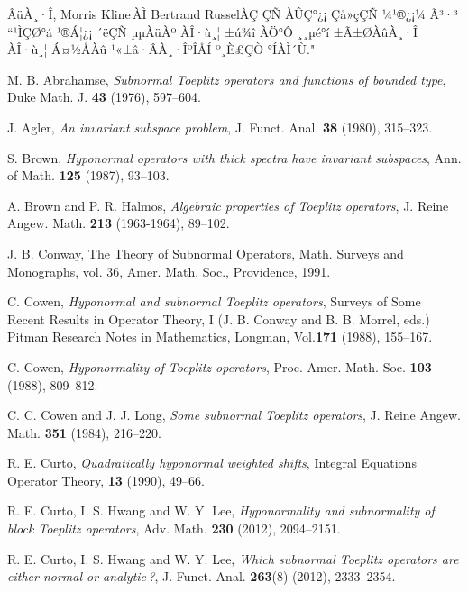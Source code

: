 \documentclass[12pt,a4paper,2sided]{article}
\begin{document}
\newpage
{}

\vspace{0.8cm}

ÂüÀ¸·Î, Morris Kline\,ÀÌ Bertrand RusselÀÇ ÇÑ ÀÛÇ°¿¡ Çå»çÇÑ ¼­¹®¿¡¼­
Ã³·³ ``¹ÌÇØ°á ¹®Á¦¿¡ ´ëÇÑ µµÀüÀº ÀÎ·ù¸¦ ±ú¾î ÀÖ°Ô ¸¸µé°í ±Ã±ØÀûÀ¸·Î
ÀÎ·ù¸¦ Á¤½ÅÀû ¹«±â·ÂÀ¸·ÎºÎÅÍ º¸È£ÇÒ °ÍÀÌ´Ù."



\begin{thebibliography}{99}\footnotesize


 M. B. Abrahamse,
{\it Subnormal Toeplitz operators and functions of bounded type},
Duke Math. J. {\bf 43} (1976), 597--604.

 J. Agler, {\it An invariant subspace problem}, J. Funct. Anal.
{\bf 38} (1980), 315--323.

 S. Brown, {\it Hyponormal operators with thick spectra have invariant subspaces},
Ann. of Math. {\bf 125} (1987), 93--103.

 A. Brown and P. R. Halmos, {\it Algebraic properties of Toeplitz operators},
J. Reine Angew. Math. {\bf 213} (1963-1964), 89--102.


 J. B. Conway, The Theory of Subnormal Operators,
Math. Surveys and Monographs, vol. 36, Amer. Math. Soc., Providence, 1991.


 C. Cowen, {\it Hyponormal and subnormal Toeplitz operators},
Surveys of Some Recent Results in Operator Theory, I (J. B. Conway
and B. B. Morrel, eds.) Pitman Research Notes in Mathematics,
Longman, Vol.{\bf 171} (1988), 155--167.

 C. Cowen, {\it Hyponormality of Toeplitz operators}, Proc. Amer. Math. Soc.
{\bf 103} (1988), 809--812.

 C. C. Cowen and J. J. Long, {\it Some subnormal Toeplitz operators},
J. Reine Angew. Math. {\bf 351} (1984), 216--220.

 R. E. Curto, {\it Quadratically hyponormal weighted shifts},
Integral Equations Operator Theory, {\bf 13} (1990), 49--66.

R. E. Curto, I. S. Hwang and W. Y. Lee,
{\it Hyponormality and subnormality of block Toeplitz operators},
Adv. Math. {\bf 230} (2012), 2094--2151.


  R. E. Curto, I. S. Hwang and W. Y. Lee,
{\it Which subnormal Toeplitz operators are either normal or
analytic\,?}, J. Funct. Anal. {\bf 263}(8) (2012), 2333--2354.



\end{thebibliography}
\end{document}
